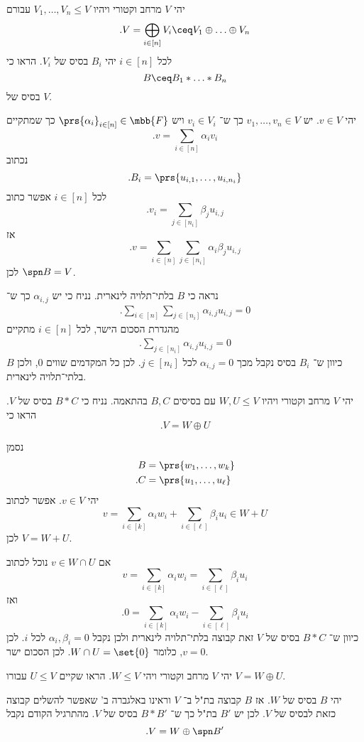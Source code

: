 \documentclass[a4paper,10pt,oneside,openany]{article}
\begin{document}
\begin{exercise}
יהי
$V$
מרחב וקטורי ויהיו
$V_1, \ldots, V_n \leq V$
עבורם
\[\text{.} V = \bigoplus_{i \in [n]} V_i \ceq V_1 \oplus \ldots \oplus V_n\]
לכל
$i \in [n]$
יהי
$B_i$
בסיס של
$V_i$.
הראו כי
\[B \ceq B_1 * \ldots * B_n\]
בסיס של
$V$.
\end{exercise}

\begin{solution}
יהי
$v \in V$.
יש
$v_1, \ldots, v_n \in V$
כך ש־%
$v_i \in V_i$
ויש
$\prs{\alpha_i}_{i \in [n]} \in \mbb{F}$
כך שמתקיים
\[\text{.} v = \sum_{i \in [n]} \alpha_i v_i\]
נכתוב
\[\text{.} B_i = \prs{u_{i,1}, \ldots, u_{i, n_i}}\]
לכל
$i \in [n]$
אפשר כתוב
\[\text{.} v_i = \sum_{j \in [n_i]} \beta_j u_{i,j}\]
אז
\[\text{.} v = \sum_{i \in [n]} \sum_{j \in [n_i]} \alpha_i \beta_j u_{i,j}\]
לכן
$\spn B = V$.

נראה כי
$B$
בלתי־תלויה לינארית.
נניח כי יש
$\alpha_{i,j}$
כך ש־%
\begin{align*}
\text{.} \sum_{i \in [n]} \sum_{j \in [n_i]} \alpha_{i,j} u_{i,j} = 0
\end{align*}
מהגדרת הסכום הישר, לכל
$i \in [n]$
מתקיים
\begin{align*}
\text{.} \sum_{j \in [n_i]} \alpha_{i,j} u_{i,j} = 0
\end{align*}
כיוון ש־%
$B_i$
בסיס נקבל מכך
$\alpha_{i,j} = 0$
לכל
$j \in [n_i]$.
לכן כל המקדמים שווים
$0$,
ולכן
$B$
בלתי־תלויה לינארית.
\end{solution}

\begin{exercise}
יהי
$V$
מרחב וקטורי ויהיו
$W,U \leq V$
עם בסיסים
$B,C$
בהתאמה.
נניח כי
$B * C$
בסיס של
$V$.
הראו כי
\[\text{.} V = W \oplus U\]
\end{exercise}

\begin{solution}
נסמן
\begin{align*}
B &= \prs{w_1, \ldots, w_k} \\
\text{.} C &= \prs{u_1, \ldots, u_\ell}
\end{align*}
יהי
$v \in V$.
אפשר לכתוב
\[v = \sum_{i \in [k]} \alpha_i w_i + \sum_{i \in [\ell]} \beta_i u_i \in W + U\]
לכן
$V = W + U$.

אם
$v \in W \cap U$
נוכל לכתוב
\[v = \sum_{i\in[k]} \alpha_i w_i = \sum_{i \in [\ell]} \beta_i u_i\]
ואז
\[\text{.} 0 = \sum_{i \in [k]} \alpha_i w_i - \sum_{i \in [\ell]} \beta_i u_i \]
כיוון ש־%
$B * C$
בסיס של
$V$
זאת קבוצה בלתי־תלויה לינארית ולכן נקבל
$\alpha_i, \beta_i = 0$
לכל
$i$.
לכן
$v = 0$,
כלומר
$W \cap U = \set{0}$.
לכן הסכום ישר.
\end{solution}

\begin{exercise}
יהי
$V$
מרחב וקטורי ויהי
$W \leq V$.
הראו שקיים
$U \leq V$
עבורו
$V = W \oplus U$.
\end{exercise}

\begin{solution}
יהי
$B$
בסיס של
$W$.
אז
$B$
קבוצה בת"ל ב־%
$V$
וראינו באלגברה ב' שאפשר להשלים קבוצה כזאת לבסיס של
$V$.
לכן יש
$B'$
בת"ל כך ש־%
$B * B'$
בסיס של
$V$.
מהתרגיל הקודם נקבל
\[\text{.} V = W \oplus \spn B'\]
\end{solution}
\end{document}

